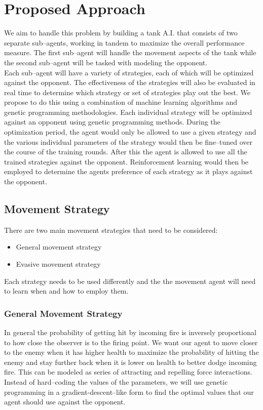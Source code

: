 \documentclass{article}
\theoremstyle{plain}
\theoremstyle{definition}
\theoremstyle{remark}
\begin{document}
\section{Proposed Approach}

We aim to handle this problem by building a tank A.I. that consists of two separate sub--agents, working in tandem to maximize the overall performance measure. The first sub--agent will handle the movement aspects of the tank while the second sub--agent will be tasked with modeling the opponent.\\

Each sub--agent will have a variety of strategies, each of which will be optimized against the opponent. The effectiveness of the strategies will also be evaluated in real time to determine which strategy or set of strategies play out the best. We propose to do this using a combination of machine learning algorithms and genetic programming methodologies. Each individual strategy will be optimized against an opponent using genetic programming methods. During the optimization period, the agent would only be allowed to use a given strategy and the various individual parameters of the strategy would then be fine--tuned over the course of the training rounds. After this the agent is allowed to use all the trained strategies against the opponent. Reinforcement learning would then be employed to determine the agents preference of each strategy as it plays against the opponent.

\subsection*{Movement Strategy}

There are two main movement strategies that need to be considered:
\begin{itemize}

\item General movement strategy

\item Evasive movement strategy
\end{itemize}

Each strategy needs to be used differently and the the movement agent will need to learn when and how to employ them.

\subsubsection*{General Movement Strategy}
In general the probability of getting hit by incoming fire is inversely proportional to how close the observer is to the firing point. We want our agent to move closer to the enemy when it has higher health to maximize the probability of hitting the enemy and stay further back when it is lower on health to better dodge incoming fire. This can be modeled as series of attracting and repelling force interactions. Instead of hard--coding the values of the parameters, we will use genetic programming in a gradient-descent--like form to find the optimal values that our agent should use against the opponent.
\end{document}
